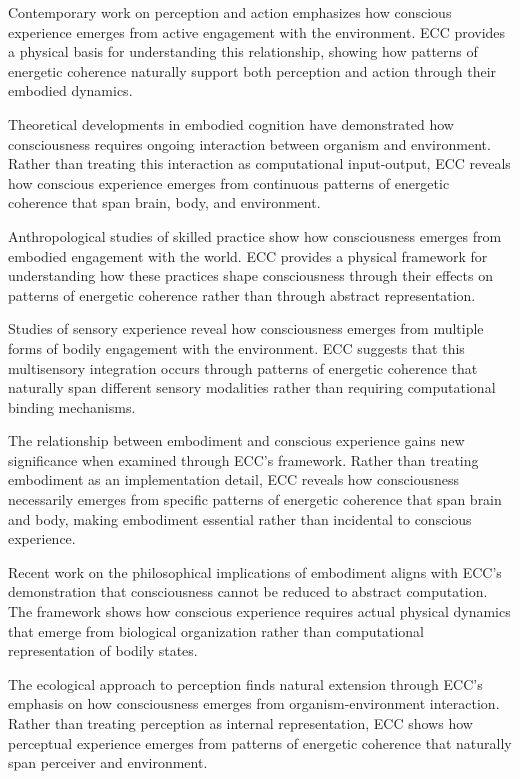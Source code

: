 \begin{refsection}
Contemporary work on perception and action \cite{Noe2004} emphasizes how conscious experience emerges from active engagement with the environment. ECC provides a physical basis for understanding this relationship, showing how patterns of energetic coherence naturally support both perception and action through their embodied dynamics.

Theoretical developments in embodied cognition \cite{Thompson2007} have demonstrated how consciousness requires ongoing interaction between organism and environment. Rather than treating this interaction as computational input-output, ECC reveals how conscious experience emerges from continuous patterns of energetic coherence that span brain, body, and environment.

Anthropological studies of skilled practice \cite{Marchand2010} show how consciousness emerges from embodied engagement with the world. ECC provides a physical framework for understanding how these practices shape consciousness through their effects on patterns of energetic coherence rather than through abstract representation.

Studies of sensory experience \cite{Howes2003} reveal how consciousness emerges from multiple forms of bodily engagement with the environment. ECC suggests that this multisensory integration occurs through patterns of energetic coherence that naturally span different sensory modalities rather than requiring computational binding mechanisms.

The relationship between embodiment and conscious experience \cite{Jackson1989} gains new significance when examined through ECC's framework. Rather than treating embodiment as an implementation detail, ECC reveals how consciousness necessarily emerges from specific patterns of energetic coherence that span brain and body, making embodiment essential rather than incidental to conscious experience.

Recent work on the philosophical implications of embodiment \cite{Lakoff1999} aligns with ECC's demonstration that consciousness cannot be reduced to abstract computation. The framework shows how conscious experience requires actual physical dynamics that emerge from biological organization rather than computational representation of bodily states.

The ecological approach to perception \cite{Gibson1979} finds natural extension through ECC's emphasis on how consciousness emerges from organism-environment interaction. Rather than treating perception as internal representation, ECC shows how perceptual experience emerges from patterns of energetic coherence that naturally span perceiver and environment.


\end{refsection}
